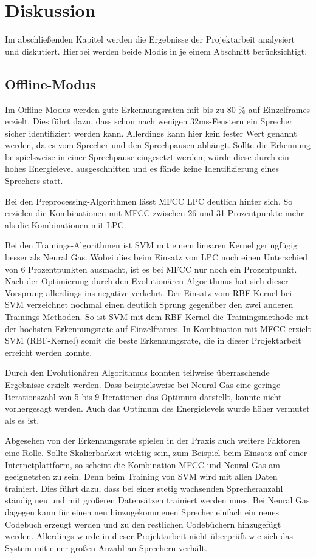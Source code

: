 \chapter{Diskussion}
\label{cha:diskussion}
Im abschließenden Kapitel werden die Ergebnisse der Projektarbeit analysiert und diskutiert. Hierbei werden beide Modis in je einem Abschnitt berücksichtigt.

\section{Offline-Modus}
Im Offline-Modus werden gute Erkennungsraten mit bis zu 80 \% auf Einzelframes erzielt. Dies führt dazu, dass schon nach wenigen 32ms-Fenstern ein Sprecher sicher identifiziert werden kann. Allerdings kann hier kein fester Wert genannt werden, da es vom Sprecher und den Sprechpausen abhängt. Sollte die Erkennung beispielsweise in einer Sprechpause eingesetzt werden, würde diese durch ein hohes Energielevel ausgeschnitten und es fände keine Identifizierung eines Sprechers statt.

Bei den Preprocessing-Algorithmen lässt MFCC LPC deutlich hinter sich. So erzielen die Kombinationen mit MFCC zwischen 26 und 31 Prozentpunkte mehr als die Kombinationen mit LPC.

Bei den Trainings-Algorithmen ist SVM mit einem linearen Kernel geringfügig besser als Neural Gas. Wobei dies beim Einsatz von LPC noch einen Unterschied von 6 Prozentpunkten ausmacht, ist es bei MFCC nur noch ein Prozentpunkt. Nach der Optimierung durch den Evolutionären Algorithmus hat sich dieser Vorsprung allerdings ins negative verkehrt. Der Einsatz vom RBF-Kernel bei SVM verzeichnet nochmal einen deutlich Sprung gegenüber den zwei anderen Trainings-Methoden. So ist SVM mit dem RBF-Kernel die Trainingsmethode mit der höchsten Erkennungsrate auf Einzelframes. In Kombination mit MFCC erzielt SVM (RBF-Kernel) somit die beste Erkennungsrate, die in dieser Projektarbeit erreicht werden konnte.

Durch den Evolutionären Algorithmus konnten teilweise überraschende Ergebnisse erzielt werden. Dass beispielsweise bei Neural Gas eine geringe Iterationszahl von 5 bis 9 Iterationen das Optimum darstellt, konnte nicht vorhergesagt werden. Auch das Optimum des Energielevels wurde höher vermutet als es ist.

Abgesehen von der Erkennungsrate spielen in der Praxis auch weitere Faktoren eine Rolle. Sollte Skalierbarkeit wichtig sein, zum Beispiel beim Einsatz auf einer Internetplattform, so scheint die Kombination MFCC und Neural Gas am geeignetsten zu sein. Denn beim Training von SVM wird mit allen Daten trainiert. Dies führt dazu, dass bei einer stetig wachsenden Sprecheranzahl ständig neu und mit größeren Datensätzen trainiert werden muss. Bei Neural Gas dagegen kann für einen neu hinzugekommenen Sprecher einfach ein neues Codebuch erzeugt werden und zu den restlichen Codebüchern hinzugefügt werden. Allerdings wurde in dieser Projektarbeit nicht überprüft wie sich das System mit einer großen Anzahl an Sprechern verhält.

